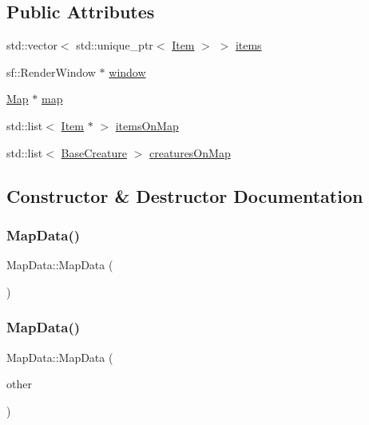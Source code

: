 \subsection*{Public Attributes}
\begin{DoxyCompactItemize}
\item 
std\+::vector$<$ std\+::unique\+\_\+ptr$<$ \mbox{\hyperlink{class_item}{Item}} $>$ $>$ \mbox{\hyperlink{class_map_data_a21cf5ee5508940f91b56046186aa6dec}{items}}
\item 
sf\+::\+Render\+Window $\ast$ \mbox{\hyperlink{class_map_data_af927873e328d1fb6a4b5c0cf145808db}{window}}
\item 
\mbox{\hyperlink{class_map}{Map}} $\ast$ \mbox{\hyperlink{class_map_data_af00f20d0b16d8d5e9ea700ba40a20bf8}{map}}
\item 
std\+::list$<$ \mbox{\hyperlink{class_item}{Item}} $\ast$ $>$ \mbox{\hyperlink{class_map_data_a8a6af49f0a89008e9fc99d3bae2d6796}{items\+On\+Map}}
\item 
std\+::list$<$ \mbox{\hyperlink{class_base_creature}{Base\+Creature}} $>$ \mbox{\hyperlink{class_map_data_a9a096967eb9377ffb6c3afd937540319}{creatures\+On\+Map}}
\end{DoxyCompactItemize}


\subsection{Constructor \& Destructor Documentation}
\mbox{\label{class_map_data_aca1581fc02ec46b4da7ed9b83c04a116}} 
\subsubsection{\texorpdfstring{Map\+Data()}{MapData()}\hspace{0.1cm}{\footnotesize\ttfamily [1/2]}}
{\footnotesize\ttfamily Map\+Data\+::\+Map\+Data (\begin{DoxyParamCaption}{ }\end{DoxyParamCaption})}

\mbox{\label{class_map_data_a4f905b12cec13eb4c1c3caaa88998898}} 
\subsubsection{\texorpdfstring{Map\+Data()}{MapData()}\hspace{0.1cm}{\footnotesize\ttfamily [2/2]}}
{\footnotesize\ttfamily Map\+Data\+::\+Map\+Data (\begin{DoxyParamCaption}\item[{\mbox{\hyperlink{class_map_data}{Map\+Data}} \&}]{other }\end{DoxyParamCaption})}



